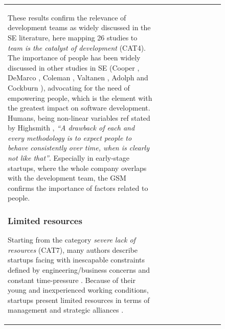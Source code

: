 \documentclass[12pt,journal,compsoc]{../sty/IEEEtran}
\begin{document}
\begin{table}[!t]
\begin{figure}[!t]
\begin{compactitem}
\begin{table}[!t]
\begin{tabular}{|l||c||c||c||c||c||c||c||c||c|}
These results confirm the relevance of development teams as widely discussed in
the SE literature, here mapping 26 studies to \textit{team is the catalyst of
development} (CAT4). The importance of people has been widely discussed in other
studies in SE (Cooper \cite{Cooper1986}, DeMarco \cite{peopleware-demarco1999},
Coleman \cite{Coleman2004}, Valtanen \cite{Valtanen2008},  Adolph
\cite{Adolph2011} and Cockburn \cite{people-first-order}), advocating for the
need of empowering people, which is the element with the greatest impact on
software development. Humans, being non-linear variables \cite{Human} %
ref %
stated by  Highsmith \cite{Highsmith2000}, \textit{``A drawback of each and
every  methodology is to expect people to behave consistently over time, when is
clearly not like that''}. Especially in early-stage startups, where the whole
company overlaps with the development team, the GSM confirms the importance of
factors related to people.


\subsubsection{Limited resources}

Starting from the category \textit{severe lack of resources} (CAT7), many
authors describe startups facing with inescapable constraints defined by
engineering/business concerns and constant time-pressure \cite{Camel1994a,
Cugola98softwareprocesses:}. Because of their young and inexperienced working
conditions, startups present limited resources in terms of management and
strategic alliances \cite{Sutton2000}.


\end{tabular}
\end{table}
\end{compactitem}
\end{figure}
\end{table}
\end{document}
